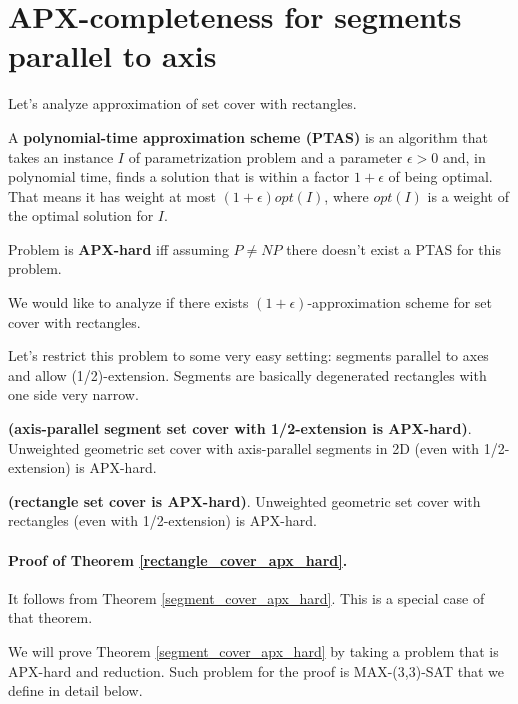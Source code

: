 \section{APX-completeness for segments parallel to axis}
\label{section:segment_apx}

Let's analyze approximation of set cover with rectangles.


\begin{defi}
A \textbf{polynomial-time approximation scheme (PTAS)}
is an algorithm that takes an instance $I$ of parametrization problem
and a parameter $\epsilon > 0$ and,
in polynomial time, finds a solution that is within a factor
$1+\epsilon$ of being optimal. That means
it has weight at most
$(1+\epsilon)opt(I)$, where $opt(I)$ is a weight
of the optimal solution for $I$.
\end{defi}

\begin{defi}
Problem is \textbf{APX-hard} iff assuming $P\neq NP$
there doesn't exist a PTAS for this problem.
\end{defi}


We would like to analyze if there exists $(1+\epsilon)$-approximation
scheme for set cover with rectangles.

Let's restrict this problem to some very easy setting:
segments parallel to axes and allow (1/2)-extension.
Segments are basically degenerated rectangles with one side very narrow.


\begin{tw}{
\label{segment_cover_apx_hard}
	\textbf{(axis-parallel segment set cover with 1/2-extension is APX-hard)}.	
	Unweighted geometric set cover
	with axis-parallel segments in 2D (even with 1/2-extension)
	is APX-hard.
}\end{tw}


\begin{tw}{
\label{rectangle_cover_apx_hard}
	\textbf{(rectangle set cover is APX-hard)}.	
	Unweighted geometric set cover
	with rectangles (even with 1/2-extension) is APX-hard.
}\end{tw}

\paragraph{Proof of Theorem \ref{rectangle_cover_apx_hard}.}
It follows from Theorem \ref{segment_cover_apx_hard}.
This is a special case of that theorem.

We will prove Theorem \ref{segment_cover_apx_hard}
by taking a problem that is APX-hard
and reduction. Such problem 
for the proof is
MAX-(3,3)-SAT that we define in detail below.

